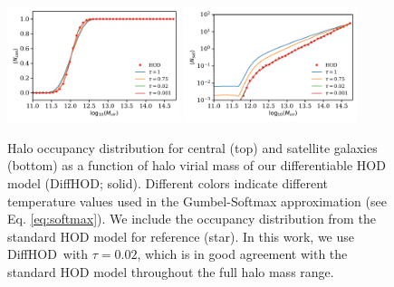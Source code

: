 \documentclass[a4paper,usenatbib]{mnras}
\newcommand{\dhod}{{\sc DiffHOD}}
\begin{document}
\begin{figure}
    \centering
    \includegraphics[width=0.45\textwidth]{paper/plots/occupancy_cen.pdf}
    \includegraphics[width=0.45\textwidth]{paper/plots/occupancy_sat.pdf}
    \caption{\label{fig:occupancy}
    Halo occupancy distribution for central (top) and satellite galaxies (bottom) 
    as a function of halo virial mass of our differentiable HOD model (\dhod; solid).
    Different colors indicate different temperature values used in the Gumbel-Softmax 
    approximation (see Eq. \ref{eq:softmax}).
    We include the occupancy distribution from the standard \cite{2007zheng} HOD model for 
    reference (star). 
    In this work, we use \dhod~with $\tau=0.02$, which is in good agreement 
    with the standard HOD model throughout the full halo mass range.
    }
\end{figure}
\end{document}
